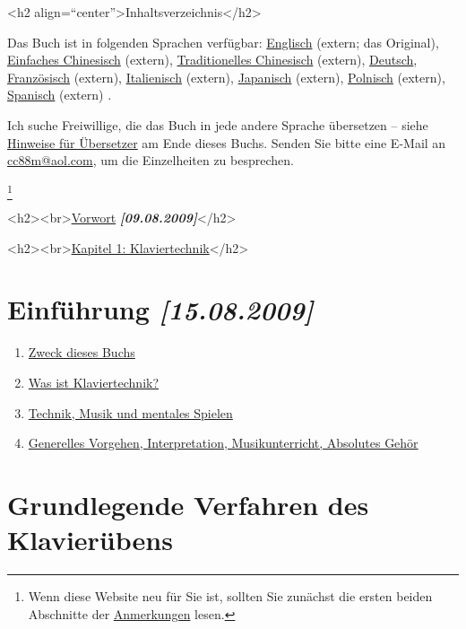 
\label{Inhalt}

<h2 align=\enquote{center}>Inhaltsverzeichnis</h2>

Das Buch ist in folgenden Sprachen verfügbar:
 \hyperref[http://www.pianopractice.org]{Englisch} (extern; das Original),
 \hyperref[http://bbs.popiano.org/viewthread.php?tid=81448&amp;extra=page\%3D3]{Einfaches Chinesisch} (extern),
 \hyperref[http://www.pianogarden.tw]{Traditionelles Chinesisch} (extern),
 \hyperref[./index.html]{Deutsch},
 \hyperref[http://pagesperso-orange.fr/musico/documents/textes/pianopratique/tabledesmatieres_fr.htm]{Französisch} (extern),
 \hyperref[http://web.tiscali.it/pianobook]{Italienisch} (extern),
 \hyperref[http://pianofundamental.sakura.ne.jp]{Japanisch} (extern),
 \hyperref[http://pianoart.eu.interia.pl]{Polnisch} (extern),
 \hyperref[http://www.pianopractice.org/spanish.pdf]{Spanisch} (extern)
 .

Ich suche Freiwillige, die das Buch in jede andere Sprache übersetzen -- siehe \hyperref[HinUeber]{Hinweise für Übersetzer} am Ende dieses Buchs.
Senden Sie bitte eine E-Mail an \hyperref[mailto:cc88m@aol.com?subject=foppde:\%20Translation\%20request]{cc88m@aol.com}, um die Einzelheiten zu besprechen.

\footnote{Wenn diese Website neu für Sie ist, sollten Sie zunächst die ersten beiden Abschnitte der \hyperref[anmerkungen]{Anmerkungen} lesen.}


<h2><br>\hyperref[preface]{Vorwort} \textbf{\textit{[09.08.2009]}}</h2>

<h2><br>\hyperref[c1i1]{Kapitel 1: Klaviertechnik}</h2>

\section{Einführung \textbf{\textit{[15.08.2009]}}}

\begin{enumerate} 
 \item \hyperref[c1i1]{Zweck dieses Buchs}
 \item \hyperref[c1i2]{Was ist Klaviertechnik?}
 \item \hyperref[c1i3]{Technik, Musik und mentales Spielen}
 \item \hyperref[c1i4]{Generelles Vorgehen, Interpretation, Musikunterricht, Absolutes Gehör}
\end{enumerate}

\section{Grundlegende Verfahren des Klavierübens}


